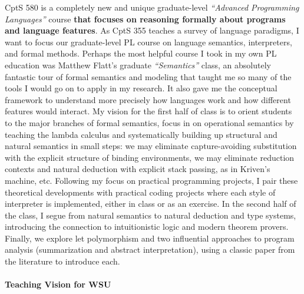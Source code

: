 \documentclass[12pt]{article}
\begin{document}
CptS 580 is a completely new and unique graduate-level \emph{``Advanced Programming Languages''} course \textbf{that focuses on reasoning formally about programs and language features}. As CptS 355 teaches a survey of language paradigms, I want to focus our graduate-level PL course on language semantics, interpreters, and formal methods. Perhaps the most helpful course I took in my own PL education was Matthew Flatt's graduate \emph{``Semantics''} class, an absolutely fantastic tour of formal semantics and modeling that taught me so many of the tools I would go on to apply in my research. It also gave me the conceptual framework to understand more precisely how languages work and how different features would interact. My vision for the first half of class is to orient students to the major branches of formal semantics, focus in on operational semantics by teaching the lambda calculus and systematically building up structural and natural semantics in small steps: we may eliminate capture-avoiding substitution with the explicit structure of binding environments, we may eliminate reduction contexts and natural deduction with explicit stack passing, as in Kriven's machine, etc. Following my focus on practical programming projects, I pair these theoretical developments with practical coding projects where each style of interpreter is implemented, either in class or as an exercise. In the second half of the class, I segue from natural semantics to natural deduction and type systems, introducing the connection to intuitionistic logic and modern theorem provers. Finally, we explore let polymorphism and two influential approaches to program analysis (summarization and abstract interpretation), using a classic paper from the literature to introduce each.


\paragraph{Teaching Vision for WSU}
\end{document}

